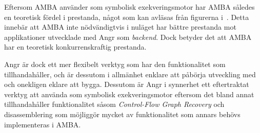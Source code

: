 Eftersom AMBA använder \stoe{} som symbolisk exekveringsmotor har AMBA
således en teoretisk fördel i prestanda, något som kan avläsas från figurerna
i~\cite[Figur~1-5]{systematic_comparison_symbex}. Detta innebär att AMBA inte
nödvändigtvis i nuläget har bättre prestanda mot applikationer utvecklade
med Angr som \emph{backend}. Dock betyder det att AMBA har en teoretisk
konkurrenskraftig prestanda.

Angr är dock ett mer flexibelt verktyg som har den funktionalitet som \stoe{}
tillhandahåller, och är dessutom i allmänhet enklare att påbörja utveckling med
och onekligen eklare att bygga. Dessutom är Angr i synnerhet ett eftertraktat
verktyg att använda som symbolisk exekveringsmotor eftersom det bland annat
tillhandahåller funktionalitet såsom \emph{Control-Flow Graph Recovery} och
disassemblering som möjliggör mycket av funktionalitet som annars behövs
implementeras i AMBA.
